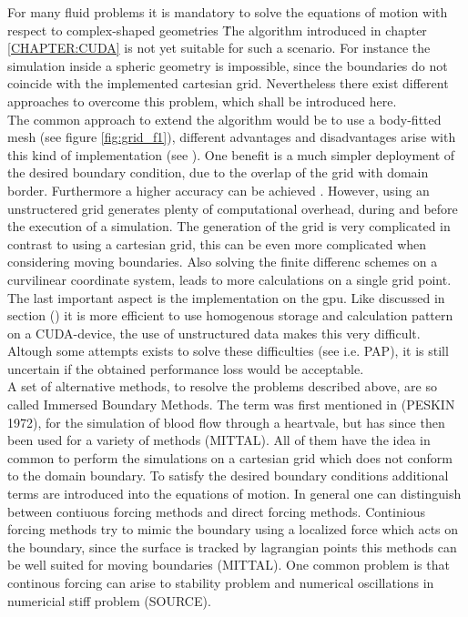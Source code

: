 For many fluid problems it is mandatory to solve the equations of motion with respect to complex-shaped geometries \.
The algorithm introduced in chapter \ref{CHAPTER:CUDA} is not yet suitable for such a scenario.
For instance the simulation inside a spheric geometry is impossible, since the boundaries
do not coincide with the implemented cartesian grid. Nevertheless there exist different approaches to overcome this problem,
which shall be introduced here. \\
The common approach to extend the algorithm would be to use a body-fitted mesh (see figure \ref{fig:grid_f1}),
different advantages and disadvantages arise with this kind of implementation (see \citep{Mittal2005}).
One benefit is a much simpler deployment of the desired boundary condition, due to the overlap of the grid with domain border.
Furthermore a higher accuracy can be achieved \citep{Gornak2013}.
However, using an unstructered grid generates plenty of computational overhead, during and before the execution of a simulation.
The generation of the grid is very complicated in contrast to using a cartesian grid, this can be even more complicated when
considering moving boundaries.
Also solving the finite differenc schemes on a curvilinear coordinate system, leads to more calculations on a single grid point.
The last important aspect is the implementation on the gpu.
Like discussed in section () it is more efficient to use homogenous storage and calculation pattern on a CUDA-device,
the use of unstructured data makes this very difficult.
Altough some attempts exists to solve these difficulties (see i.e. PAP), it is still uncertain if the obtained performance loss would be acceptable.\\
A set of alternative methods, to resolve the problems described above, are so called Immersed Boundary Methods.
The term was first mentioned in (PESKIN 1972), for the simulation of blood flow through a heartvale, but has since then been used for a variety of
methods (MITTAL).  All of them have the idea in common to perform the simulations on a cartesian grid which does not conform to the domain boundary.
To satisfy the desired boundary conditions additional terms are introduced into the equations of motion.
In general one can distinguish between contiuous forcing methods and direct forcing methods.
Continious forcing methods try to mimic the boundary using a localized force which acts on the boundary,
since the surface is tracked by lagrangian points this methods can be well suited for moving boundaries (MITTAL).
One common problem is that continous forcing can arise to stability problem and numerical oscillations in numericial stiff problem (SOURCE).
